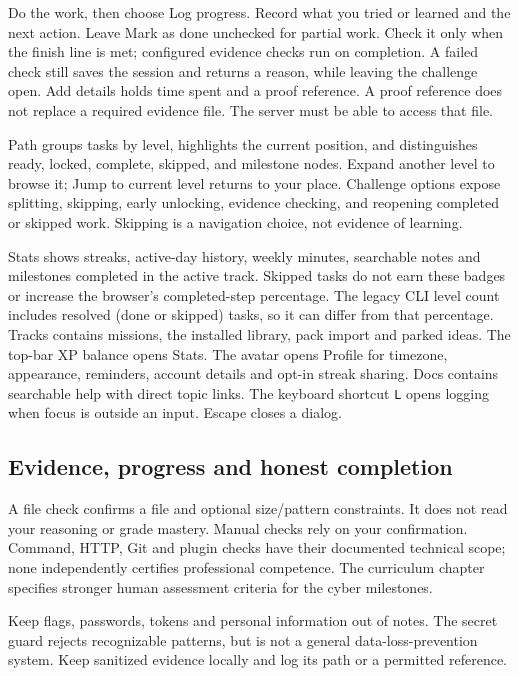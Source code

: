Do the work, then choose Log progress. Record what you tried or learned and the
next action. Leave Mark as done unchecked for partial work. Check it only when the
finish line is met; configured evidence checks run on completion. A failed check
still saves the session and returns a reason, while leaving the challenge open.
Add details holds time spent and a proof reference. A proof reference does not
replace a required evidence file. The server must be able to access that file.

Path groups tasks by level, highlights the current position, and distinguishes
ready, locked, complete, skipped, and milestone nodes. Expand another level to
browse it; Jump to current level returns to your place. Challenge options expose
splitting, skipping, early unlocking, evidence checking, and reopening completed
or skipped work. Skipping is a navigation choice, not evidence of learning.

Stats shows streaks, active-day history, weekly minutes, searchable notes and
milestones completed in the active track. Skipped tasks do not earn these badges
or increase the browser's completed-step percentage. The legacy CLI level count
includes resolved (done or skipped) tasks, so it can differ from that percentage.
Tracks contains missions, the installed library, pack import and parked ideas.
The top-bar XP balance opens Stats. The avatar opens Profile for timezone,
appearance, reminders, account details and opt-in streak sharing. Docs contains
searchable help with direct topic links. The keyboard shortcut
\texttt{L} opens logging when focus is outside an input. Escape closes a dialog.

\subsection{Evidence, progress and honest completion}
A file check confirms a file and optional size/pattern constraints. It does not
read your reasoning or grade mastery. Manual checks rely on your confirmation.
Command, HTTP, Git and plugin checks have their documented technical scope;
none independently certifies professional competence. The curriculum chapter
specifies stronger human assessment criteria for the cyber milestones.

Keep flags, passwords, tokens and personal information out of notes. The secret
guard rejects recognizable patterns, but is not a general data-loss-prevention
system. Keep sanitized evidence locally and log its path or a permitted reference.

